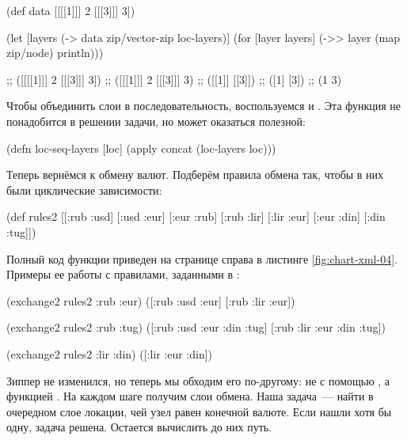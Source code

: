\begin{english}
  \begin{clojure}
(def data
  [[[[1]]] 2 [[[3]]] 3])

(let [layers (-> data
                 zip/vector-zip
                 loc-layers)]
  (for [layer layers]
    (->> layer
         (map zip/node)
         println)))

;; ([[[[1]]] 2 [[[3]]] 3])
;; ([[[1]]] 2 [[[3]]] 3)
;; ([[1]] [[3]])
;; ([1] [3])
;; (1 3)
  \end{clojure}
\end{english}

Чтобы объединить слои в последовательность, воспользуемся  и
. Эта функция не понадобится в решении задачи, но может оказаться
полезной:

\begin{english}
  \begin{clojure}
(defn loc-seq-layers [loc]
  (apply concat (loc-layers loc)))
  \end{clojure}
\end{english}

Теперь вернёмся к обмену валют. Подберём правила обмена так, чтобы в них были
циклические зависимости:


\begin{english}
  \begin{clojure}
(def rules2
  [[:rub :usd]
   [:usd :eur]
   [:eur :rub]
   [:rub :lir]
   [:lir :eur]
   [:eur :din]
   [:din :tug]])
  \end{clojure}
\end{english}

Полный код функции  приведен на странице справа в листинге
\ref{fig:chart-xml-04}. Примеры ее работы с правилами, заданными в
:

\begin{english}
  \begin{clojure}
(exchange2 rules2 :rub :eur)
([:rub :usd :eur]
 [:rub :lir :eur])

(exchange2 rules2 :rub :tug)
([:rub :usd :eur :din :tug]
 [:rub :lir :eur :din :tug])

(exchange2 rules2 :lir :din)
([:lir :eur :din])
  \end{clojure}
\end{english}

Зиппер не изменился, но теперь мы обходим его по-другому: не с помощью
, а функцией . На каждом шаге получим слои
обмена. Наша задача~--- найти в очередном слое локации, чей узел равен конечной
валюте. Если нашли хотя бы одну, задача решена. Остается вычислить до них путь.

